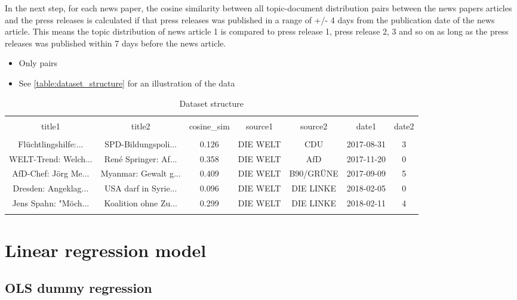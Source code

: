 \documentclass[
]{article}
\providecommand{\tightlist}{%
  \setlength{\itemsep}{0pt}\setlength{\parskip}{0pt}}
\begin{document}
In the next step, for each news paper, the cosine similarity between all
topic-document distribution pairs between the news papers articles and
the press releases is calculated if that press releases was published in
a range of +/- 4 days from the publication date of the news article.
This means the topic distribution of news article 1 is compared to press
release 1, press release 2, 3 and so on as long as the press releases
was published within 7 days before the news article.

\begin{itemize}
\tightlist
\item
  Only pairs
\item
  See \autoref{table:dataset_structure} for an illustration of the data
\end{itemize}

\begin{table}[!htbp] \centering 
  \caption{Dataset structure} 
  \label{table:dataset_structure} 
\tiny 
\begin{tabular}{@{\extracolsep{5pt}} ccccccc} 
\\[-1.8ex]\hline 
\hline \\[-1.8ex] 
title1 & title2 & cosine\_sim & source1 & source2 & date1 & date2 \\ 
\hline \\[-1.8ex] 
Flüchtlingshilfe:... &  SPD-Bildungspoli... & 0.126 & DIE WELT & CDU & 2017-08-31 & 3 \\ 
WELT-Trend: Welch... & René Springer: Af... & 0.358 & DIE WELT & AfD & 2017-11-20 & 0 \\ 
AfD-Chef: Jörg Me... & Myanmar: Gewalt g... & 0.409 & DIE WELT & B90/GRÜNE & 2017-09-09 & 5 \\ 
Dresden: Angeklag... & USA darf in Syrie... & 0.096 & DIE WELT & DIE LINKE & 2018-02-05 & 0 \\ 
Jens Spahn: "Möch... & Koalition ohne Zu... & 0.299 & DIE WELT & DIE LINKE & 2018-02-11 & 4 \\ 
\hline \\[-1.8ex] 
\end{tabular} 
\end{table}

\hypertarget{linear-regression-model}{%
\section{Linear regression model}\label{linear-regression-model}}

\hypertarget{ols-dummy-regression}{%
\subsection{OLS dummy regression}\label{ols-dummy-regression}}
\end{document}

